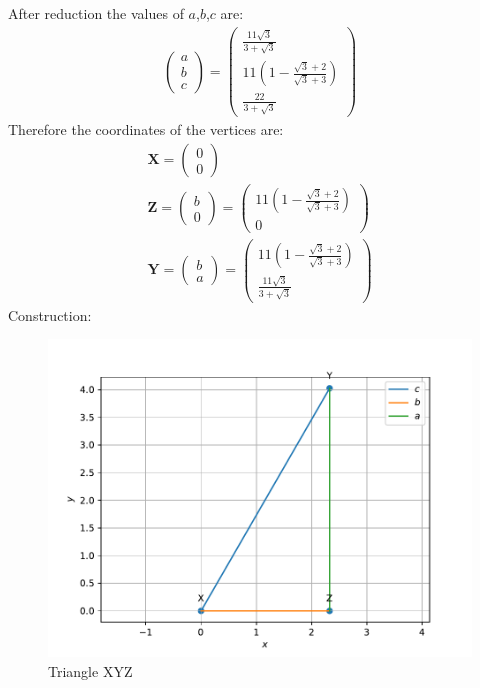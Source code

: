 \documentclass[10pt]{article}
\newcommand{\myvec}[1]{\ensuremath{\begin{pmatrix}#1\end{pmatrix}}}
\let\vec\mathbf{}
\begin{document}
 After reduction the values of $a$,$b$,$c$ are:
 \begin{align}
     \myvec{a \\ b \\ c}=\myvec{\frac{11\sqrt{3}}{3+\sqrt{3}} \\ 11(1-\frac{\sqrt{3}+2}{\sqrt{3}+3}) \\\frac{22}{3+\sqrt{3}}}
 \end{align}
 Therefore the coordinates of the vertices are:
 \begin{align}
      \vec{X}=\myvec{0\\0}\\
      \vec{Z}=\myvec{b \\ 0}=\myvec{11(1-\frac{\sqrt{3}+2}{\sqrt{3}+3}) \\ 0}\\                                               
      \vec{Y}=\myvec{b \\ a}=\myvec{11(1-\frac{\sqrt{3}+2}{\sqrt{3}+3}) \\ \frac{11\sqrt{3}}{3+\sqrt{3}} }
 \end{align}
 Construction:\\
 \begin{figure}[h]
	 \begin{center}
		 \includegraphics[width=\columnwidth]{code(m)/fig.pdf}
	 \end{center}
	 \caption{Triangle XYZ}
	 \label{fig:Fig1}
 \end{figure}
\end{document}
